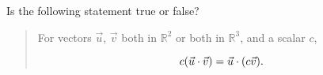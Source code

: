 \documentclass{ximera}
\author{Gregory Hartman \and Matthew Carr}
\begin{document}
\begin{exercise}



Is the following statement true or false?

\begin{quote}
For vectors $\vec{u}$, $\vec{v}$ both in $\mathbb{R}^2$ or both in $\mathbb{R}^3$, and a scalar $c$,

\[
c(\vec{u}\cdot\vec{v})=\vec{u}\cdot(c\vec{v})\ldotp
\]

\end{quote}

\begin{multipleChoice}
\end{multipleChoice}

\end{exercise}
\end{document}
